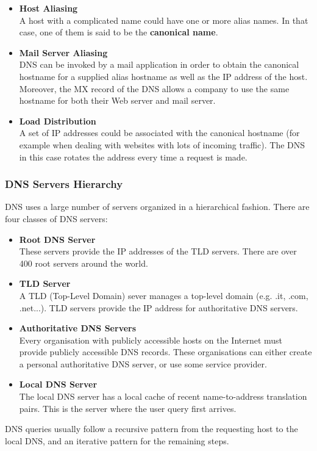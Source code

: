 \documentclass{article}
\begin{document}
\begin{itemize}
	\item \textbf{Host Aliasing}
	\vspace{.2cm} \\
	A host with a complicated name could have one or more alias names. In that case, one of them is said to be the \textbf{canonical name}.
	\item \textbf{Mail Server Aliasing}
	\vspace{.2cm} \\
	DNS can be invoked by a mail application in order to obtain the canonical hostname for a supplied alias hostname as well as the IP address of the host. Moreover, the MX record of the DNS allows a company to use the same hostname for both their Web server and mail server.
	\item \textbf{Load Distribution}
	\vspace{.2cm} \\
	A set of IP addresses could be associated with the canonical hostname (for example when dealing with websites with lots of incoming traffic). The DNS in this case rotates the address every time a request is made.
\end{itemize}

\subsubsection{DNS Servers Hierarchy}
DNS uses a large number of servers organized in a hierarchical fashion. There are four classes of DNS servers:

\begin{itemize}
	\item \textbf{Root DNS Server}
	\vspace{.2cm} \\
	These servers provide the IP addresses of the TLD servers. There are over 400 root servers around the world.
	\item \textbf{TLD Server}
	\vspace{.2cm} \\
	A TLD (Top-Level Domain) sever manages a top-level domain (e.g. .it, .com, .net...). TLD servers provide the IP address for authoritative DNS servers.
	\item \textbf{Authoritative DNS Servers}
	\vspace{.2cm} \\
	Every organisation with publicly accessible hosts on the Internet must provide publicly accessible DNS records. These organisations can either create a personal authoritative DNS server, or use some service provider.
	\item \textbf{Local DNS Server}
	\vspace{.2cm} \\
	The local DNS server has a local cache of recent name-to-address translation pairs. This is the server where the user query first arrives.
\end{itemize}
DNS queries usually follow a recursive pattern from the requesting host to the local DNS, and an iterative pattern for the remaining steps.
\end{document}
